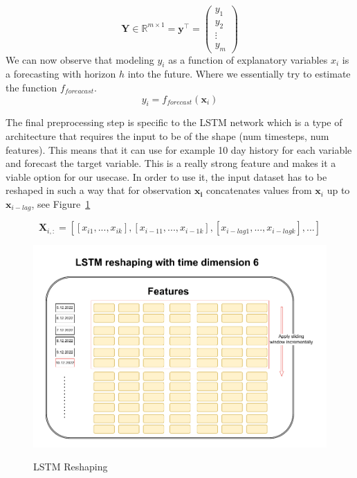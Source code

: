 \begin{equation}\label{eq:target}
    \mathbf{Y} \in \mathbb{R}^{m \times 1} = \mathbf{y^\top} = 
\begin{pmatrix}
    y_{1}\\
    y_{2}\\
    \vdots  \\
    y_{m} 
\end{pmatrix}
\end{equation}
We can now observe that modeling $y_i$ as a function of
explanatory variables $x_{i}$ is a forecasting with horizon $h$ into the future.
Where we essentially try to estimate the function $f_{foreacast}$.
\begin{equation}\label{eq:model_simple}
    y_i = f_{forecast}(\mathbf{x}_{i})
\end{equation}

The final preprocessing step is specific to the \ac{LSTM} network which is
a type of architecture that requires the input to be of 
the shape (num timesteps, num features).
This means that it can use for example 10 day history for each variable
and forecast the target variable. This is a really strong feature and 
makes it a viable option for our usecase. In order to use it, the input dataset
has to be reshaped in such a way that for observation $\mathbf{x_{i}}$ 
concatenates values from $\mathbf{x}_{i}$ 
up to $\mathbf{x}_{i-lag}$, see Figure~\ref{fig:dataset_lstm_reshape}


\begin{equation}\label{eq:lstm_reshape}
    \mathbf{X}_{i,:} = [[{x}_{i1},...,{x}_{ik}],
    [{x}_{i-11},...,{x}_{i-1k}],
    [{x}_{i-lag1},...,{x}_{i-lagk}],...]
\end{equation}

\begin{figure}[!h]
    \centering
    \caption{LSTM Reshaping}
        \includegraphics[width=1\textwidth]{Figures/LSTM_reshaping.drawio.pdf}
    \label{fig:dataset_lstm_reshape}
\end{figure}